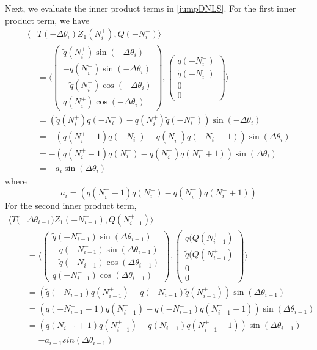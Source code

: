 \documentclass[12pt]{article}
\begin{document}
Next, we evaluate the inner product terms in \eqref{jumpDNLS}. For the first inner product term, we have
\begin{align*}
\langle &T(-\Delta\theta_i) Z_1(N_i^+), Q(-N_i^-) \rangle \\
&= \langle 
\begin{pmatrix}
\tilde{q}(N_i^+)\sin(-\Delta\theta_i) \\
-q(N_i^+)\sin(-\Delta\theta_i) \\ 
-\tilde{q}(N_i^+)\cos(-\Delta\theta_i) \\
q(N_i^+)\cos(-\Delta\theta_i)
\end{pmatrix},
\begin{pmatrix}
q(-N_i^-) \\ \tilde{q}(-N_i^-) \\ 0 \\ 0 
\end{pmatrix}
\rangle \\
&= (\tilde{q}(N_i^+)q(-N_i^-) - q(N_i^+)\tilde{q}(-N_i^-))\sin(-\Delta\theta_i) \\
&= -(q(N_i^+ - 1)q(-N_i^-) - q(N_i^+)q(-N_i^- - 1))\sin(\Delta\theta_i) \\
&= -(q(N_i^+ - 1)q(N_i^-) - q(N_i^+)q(N_i^- + 1))\sin(\Delta\theta_i) \\
&= -a_i \sin(\Delta\theta_i) 
\end{align*}
where 
\[
a_i = (q(N_i^+ - 1)q(N_i^-) - q(N_i^+)q(N_i^- + 1))
\]
For the second inner product term,
\begin{align*}
\langle T(&\Delta\theta_{i-1}) Z_1(-N_{i-1}^-), Q(N_{i-1}^+) \rangle \\
&= \langle 
\begin{pmatrix}
\tilde{q}(-N_{i-1}^-)\sin(\Delta\theta_{i-1}) \\
-q(-N_{i-1}^-)\sin(\Delta\theta_{i-1}) \\ 
-\tilde{q}(-N_{i-1}^-)\cos(\Delta\theta_{i-1}) \\
q(-N_{i-1}^-)\cos(\Delta\theta_{i-1})
\end{pmatrix},
\begin{pmatrix}
q(Q(N_{i-1}^+) \\ \tilde{q}(Q(N_{i-1}^+) \\ 0 \\ 0 
\end{pmatrix}
\rangle \\
&= (\tilde{q}(-N_{i-1}^-)q(N_{i-1}^+) - q(-N_{i-1}^-)\tilde{q}(N_{i-1}^+))\sin(\Delta\theta_{i-1}) \\
&= (q(-N_{i-1}^- - 1)q(N_{i-1}^+) - q(-N_{i-1}^-)q(N_{i-1}^+ - 1))\sin(\Delta\theta_{i-1}) \\
&= (q(N_{i-1}^- + 1)q(N_{i-1}^+) - q(N_{i-1}^-)q(N_{i-1}^+ - 1))\sin(\Delta\theta_{i-1}) \\
&= -a_{i-1} sin(\Delta\theta_{i-1})
\end{align*}
\end{document}
